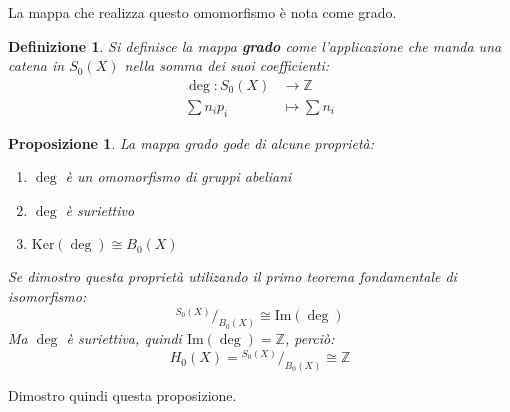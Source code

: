 \documentclass[10pt, twoside=false, x11names]{scrbook}
\newtheorem{proposition}[theorem]{Proposizione}
\newtheorem{definition}[theorem]{Definizione}
\newcommand{\Z}{\mathbb{Z}}
\newcommand{\im}[1]{\mathrm{Im}( #1 )}
\renewcommand{\ker}[1]{\mathrm{Ker}( #1)}
\newcommand*\quot[2]{{^{\textstyle #1}\big/_{\textstyle #2}}}
\begin{document}
La mappa che realizza questo omomorfismo è nota come grado.
\begin{definition}
  Si definisce la mappa \textbf{grado}  come l'applicazione che manda una catena in $ S_0(X) $ nella somma
  dei suoi coefficienti:
  \begin{align*}
    \deg \colon S_0(X)    & \to  \Z \\
    \sum n_i p_i & \mapsto  \sum n_i
  \end{align*}
\end{definition}

\begin{proposition}
  La mappa grado gode di alcune proprietà:
  \begin{enumerate}
  \item $ \deg $ è un omomorfismo di gruppi abeliani
  \item $ \deg $ è suriettivo
  \item $ \ker{\deg} \cong B_0(X) $
  \end{enumerate}
  Se dimostro questa proprietà utilizando il primo teorema fondamentale di isomorfismo:
  \[
    \quot{S_0(X)}{B_0(X)} \cong \im{\deg}
  \]
  Ma $ \deg $ è suriettiva, quindi $ \im{\deg} = \Z $, perciò:
  \[
    H_0(X) = \quot{S_0(X)}{B_0(X)} \cong \Z
  \]
\end{proposition}
Dimostro quindi questa proposizione.
\end{document}
